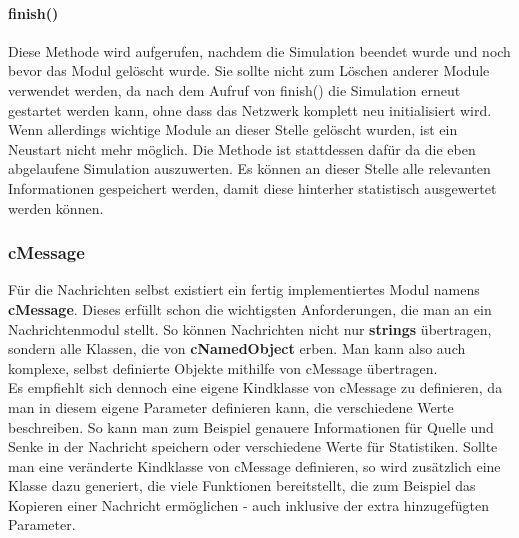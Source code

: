 \paragraph{finish()}

Diese Methode wird aufgerufen, nachdem die Simulation beendet wurde und noch bevor das Modul gelöscht wurde. Sie sollte nicht zum Löschen anderer Module verwendet werden, da nach dem Aufruf von finish() die Simulation erneut gestartet werden kann, ohne dass das Netzwerk komplett neu initialisiert wird. Wenn allerdings wichtige Module an dieser Stelle gelöscht wurden, ist ein Neustart nicht mehr möglich.\newline
Die Methode ist stattdessen dafür da die eben abgelaufene Simulation auszuwerten. Es können an dieser Stelle alle relevanten Informationen gespeichert werden, damit diese hinterher statistisch ausgewertet werden können.

\subsubsection{cMessage}

Für die Nachrichten selbst existiert ein fertig implementiertes Modul namens \textbf{cMessage}. Dieses erfüllt schon die wichtigsten Anforderungen, die man an ein Nachrichtenmodul stellt. So können Nachrichten nicht nur \textbf{strings} übertragen, sondern alle Klassen, die von \textbf{cNamedObject} erben. Man kann also auch komplexe, selbst definierte Objekte mithilfe von cMessage übertragen.\\
Es empfiehlt sich dennoch eine eigene Kindklasse von cMessage zu definieren, da man in diesem eigene Parameter definieren kann, die verschiedene Werte beschreiben. So kann man zum Beispiel genauere Informationen für Quelle und Senke in der Nachricht speichern oder verschiedene Werte für Statistiken. Sollte man eine veränderte Kindklasse von cMessage definieren, so wird zusätzlich eine Klasse dazu generiert, die viele Funktionen bereitstellt, die zum Beispiel das Kopieren einer Nachricht ermöglichen - auch inklusive der extra hinzugefügten Parameter.

